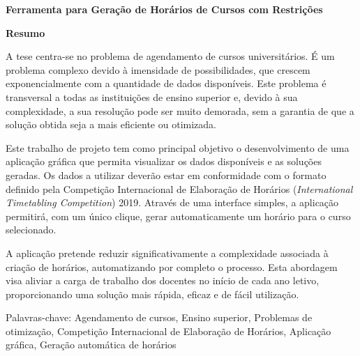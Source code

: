 {\centering\bfseries\fontsize{17}{24}\selectfont Ferramenta para Geração de Horários de Cursos com Restrições \par}
\vspace{.5cm}

{\centering\bfseries\fontsize{17}{24}\selectfont Resumo \par}
\vspace{1cm}

A tese centra-se no problema de agendamento de cursos universitários. É um problema complexo devido à imensidade de possibilidades, que crescem exponencialmente com a quantidade de dados disponíveis. Este problema é transversal a todas as instituições de ensino superior e, devido à sua complexidade, a sua resolução pode ser muito demorada, sem a garantia de que a solução obtida seja a mais eficiente ou otimizada.

Este trabalho de projeto tem como principal objetivo o desenvolvimento de uma aplicação gráfica que permita visualizar os dados disponíveis e as soluções geradas. Os dados a utilizar deverão estar em conformidade com o formato definido pela Competição Internacional de Elaboração de Horários (\textit{International Timetabling Competition}) 2019. Através de uma interface simples, a aplicação permitirá, com um único clique, gerar automaticamente um horário para o curso selecionado.

A aplicação pretende reduzir significativamente a complexidade associada à criação de horários, automatizando por completo o processo. Esta abordagem visa aliviar a carga de trabalho dos docentes no início de cada ano letivo, proporcionando uma solução mais rápida, eficaz e de fácil utilização.

\vfill

Palavras-chave: Agendamento de cursos, Ensino superior, Problemas de otimização, Competição Internacional de Elaboração de Horários, Aplicação gráfica, Geração automática de horários
